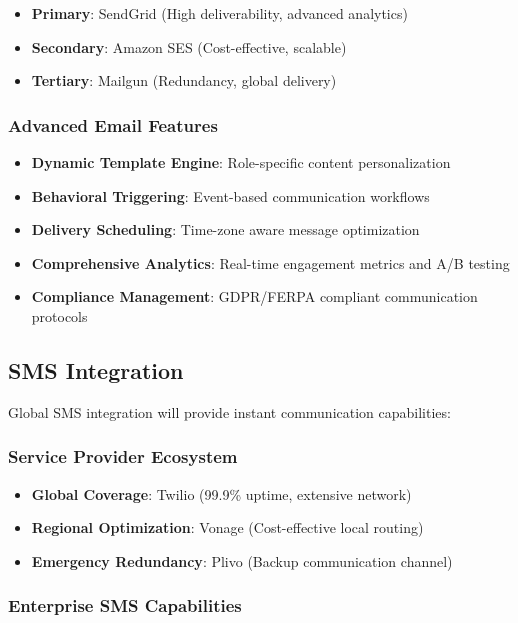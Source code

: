 \begin{itemize}
    \item \textbf{Primary}: SendGrid (High deliverability, advanced analytics)
    \item \textbf{Secondary}: Amazon SES (Cost-effective, scalable)
    \item \textbf{Tertiary}: Mailgun (Redundancy, global delivery)
\end{itemize}

\subsubsection{Advanced Email Features}

\begin{itemize}
    \item \textbf{Dynamic Template Engine}: Role-specific content personalization
    \item \textbf{Behavioral Triggering}: Event-based communication workflows
    \item \textbf{Delivery Scheduling}: Time-zone aware message optimization
    \item \textbf{Comprehensive Analytics}: Real-time engagement metrics and A/B testing
    \item \textbf{Compliance Management}: GDPR/FERPA compliant communication protocols
\end{itemize}

\subsection{SMS Integration}

Global SMS integration will provide instant communication capabilities:

\subsubsection{Service Provider Ecosystem}

\begin{itemize}
    \item \textbf{Global Coverage}: Twilio (99.9\% uptime, extensive network)
    \item \textbf{Regional Optimization}: Vonage (Cost-effective local routing)
    \item \textbf{Emergency Redundancy}: Plivo (Backup communication channel)
\end{itemize}

\subsubsection{Enterprise SMS Capabilities}

